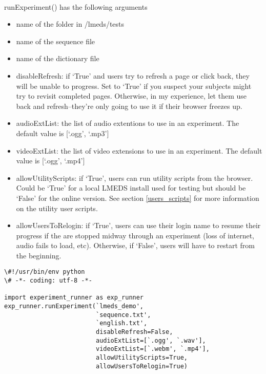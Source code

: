 \paragraph{}
runExperiment() has the following arguments

\begin{itemize}
\item name of the folder in /lmeds/tests
\item name of the sequence file
\item name of the dictionary file
\item disableRefresh: if `True' and users try to refresh a page or click back, they will be unable to progress.  Set to `True' if you suspect your subjects might try to revisit completed pages.  Otherwise, in my experience, let them use back and refresh--they're only going to use it if their browser freezes up.
\item audioExtList: the list of audio extentions to use in an experiment.  The default value is [`.ogg', `.mp3']
\item videoExtList: the list of video extensions to use in an experiment.  The default value is [`.ogg', `.mp4']
\item allowUtilityScripts: if `True', users can run utility scripts from the browser.  Could be `True' for a local LMEDS install used for testing but should be `False' for the online version.  See section \ref{users_scripts} for more information on the utility user scripts.
\item allowUsersToRelogin: if `True', users can use their login name to resume their progress if the are stopped midway through an experiment (loss of internet, audio fails to load, etc).  Otherwise, if `False', users will have to restart from the beginning.
\end{itemize}

\begin{tcolorbox}[colback=white,colframe=blue,width=\dimexpr\textwidth+12mm\relax,enlarge left by=-6mm,enlarge right by=6mm]

\begin{lstlisting}
\#!/usr/bin/env python
\# -*- coding: utf-8 -*-

import experiment_runner as exp_runner
exp_runner.runExperiment(`lmeds_demo',
                         `sequence.txt',
                         `english.txt',
                         disableRefresh=False,
                         audioExtList=[`.ogg', `.wav'],
                         videoExtList=[`.webm', `.mp4'],
                         allowUtilityScripts=True,
                         allowUsersToRelogin=True)
\end{lstlisting}
\end{tcolorbox}
